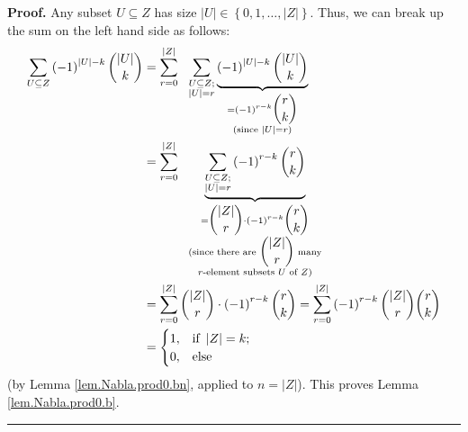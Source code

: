 \documentclass[numbers=enddot,12pt,final,onecolumn,notitlepage]{scrartcl}%
\numberwithin{exer}{subsection}
\theoremstyle{definition}
\newenvironment{proof}[1][Proof]{\noindent\textbf{#1.} }{\ \rule{0.5em}{0.5em}}
\let\sumnonlimits\sum
\renewcommand{\sum}{\sumnonlimits\limits}
\begin{document}
\begin{proof}
Any subset $U\subseteq Z$ has size $\left\vert U\right\vert \in\left\{
0,1,\ldots,\left\vert Z\right\vert \right\}  $. Thus, we can break up the sum
on the left hand side as follows:%
\begin{align*}
\sum_{U\subseteq Z}\left(  -1\right)  ^{\left\vert U\right\vert -k}%
\dbinom{\left\vert U\right\vert }{k}  &  =\sum_{r=0}^{\left\vert Z\right\vert
}\ \ \sum_{\substack{U\subseteq Z;\\\left\vert U\right\vert =r}%
}\underbrace{\left(  -1\right)  ^{\left\vert U\right\vert -k}\dbinom
{\left\vert U\right\vert }{k}}_{\substack{=\left(  -1\right)  ^{r-k}\dbinom
{r}{k}\\\text{(since }\left\vert U\right\vert =r\text{)}}}\\
&  =\sum_{r=0}^{\left\vert Z\right\vert }\ \ \underbrace{\sum
_{\substack{U\subseteq Z;\\\left\vert U\right\vert =r}}\left(  -1\right)
^{r-k}\dbinom{r}{k}}_{\substack{=\dbinom{\left\vert Z\right\vert }{r}%
\cdot\left(  -1\right)  ^{r-k}\dbinom{r}{k}\\\text{(since there are }%
\dbinom{\left\vert Z\right\vert }{r}\text{ many}\\r\text{-element subsets
}U\text{ of }Z\text{)}}}\\
&  =\sum_{r=0}^{\left\vert Z\right\vert }\dbinom{\left\vert Z\right\vert }%
{r}\cdot\left(  -1\right)  ^{r-k}\dbinom{r}{k}=\sum_{r=0}^{\left\vert
Z\right\vert }\left(  -1\right)  ^{r-k}\dbinom{\left\vert Z\right\vert }%
{r}\dbinom{r}{k}\\
&  =%
\begin{cases}
1, & \text{if }\left\vert Z\right\vert =k;\\
0, & \text{else}%
\end{cases}
\end{align*}
(by Lemma \ref{lem.Nabla.prod0.bn}, applied to $n=\left\vert Z\right\vert $).
This proves Lemma \ref{lem.Nabla.prod0.b}.
\end{proof}
\end{document}
